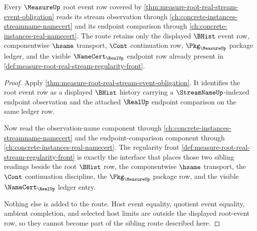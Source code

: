 \begin{theorem}
\label{thm:measure-root-real-stream-sibling-route-exactness}
Every $\MeasureUp$ root event row covered by
\autoref{thm:measure-root-real-stream-event-obligation} reads its stream
observation through \autoref{ch:concrete-instances-streamname-namecert} and its
endpoint comparison through \autoref{ch:concrete-instances-real-namecert}. The
route retains only the displayed $\BHist$ event row, componentwise $\hsame$
transport, $\Cont$ continuation row, $\Pkg_{\MeasureUp}$ package ledger, and the
visible $\NameCert_{\RealUp}$ endpoint row already present in
\autoref{def:measure-root-real-stream-regularity-front}.
\end{theorem}
\begin{proof}
Apply \autoref{thm:measure-root-real-stream-event-obligation}. It identifies
the root event row as a displayed $\BHist$ history carrying a
$\StreamNameUp$-indexed endpoint observation and the attached $\RealUp$
endpoint comparison on the same ledger row.

Now read the observation-name component through
\autoref{ch:concrete-instances-streamname-namecert} and the endpoint-comparison
component through \autoref{ch:concrete-instances-real-namecert}. The regularity
front \autoref{def:measure-root-real-stream-regularity-front} is exactly the
interface that places those two sibling readings beside the root $\BHist$ row,
the componentwise $\hsame$ transport, the $\Cont$ continuation discipline, the
$\Pkg_{\MeasureUp}$ package row, and the visible $\NameCert_{\RealUp}$ ledger
entry.

Nothing else is added to the route. Host event equality, quotient event
equality, ambient completion, and selected host limits are outside the displayed
root-event row, so they cannot become part of the sibling route described here.
\end{proof}

